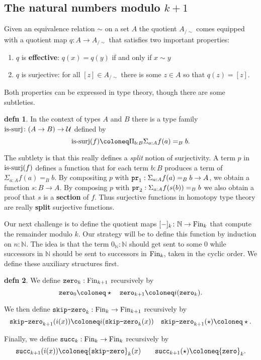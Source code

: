 \documentclass{amsart}
\theoremstyle{theorem}
\theoremstyle{definition}
\newtheorem*{defn}{defn}
\theoremstyle{remark}
\newcommand{\0}{\mathbbe{0}}
\newcommand{\1}{\mathbbe{1}}
\newcommand{\2}{\mathbbe{2}}
\newcommand{\3}{\mathbbe{3}}
\newcommand{\4}{\mathbbe{4}}
\newcommand{\term}[1]{{\textup{\texttt{#1}}}}
\newcommand{\type}[1]{{\textup{#1}}}
\newcommand{\bN}{{\mathbb{N}}}
\newcommand{\pr}{\term{pr}}
\newcommand{\UU}{{\mathcal{U}}}
\begin{document}
\subsection*{The natural numbers modulo $k+1$}

Given an equivalence relation $\sim$ on a set $A$ the quotient $A_{/\sim}$ comes equipped with a quotient map $q \colon A \to A_{/\sim}$ that satisfies two important properties:
\begin{enumerate}
\item $q$ is \textbf{effective}: $q(x) = q(y)$ if and only if $x \sim y$
\item $q$ is surjective: for all $[z] \in A_{/\sim}$ there is some $z \in A$ so that $q(z) = [z]$.
\end{enumerate}

Both properties can be expressed in type theory, though there are some subtleties.

\begin{defn} In the context of types $A$ and $B$ there is a type family $\type{is-surj} \colon (A \to B) \to \UU$ defined by
\[ \type{is-surj}(f) \coloneq \Pi_{b : B} \Sigma_{a : A} f(a) =_B b.\]
\end{defn}

The subtlety is that this really defines a \emph{split} notion of surjectivity. A term $p$ in $\type{is-surj}(f)$ defines a function that for each term $b : B$ produces a term of $\Sigma_{a : A} f(a) =_B b$. By compositing $p$ with $\pr_1 : \Sigma_{a : A} f(a) =_B b \to A$, we obtain a function $s \colon B \to A$. By composing $p$ with $\pr_2 : \Sigma_{a : A} f(s(b)) =_B b$ we also obtain a proof that $s$ is a \textbf{section} of $f$. Thus surjective functions in homotopy type theory are really \textbf{split} surjective functions.

Our next challenge is to define the quotient maps $[-]_{k} \colon \bN \to \type{Fin}_{k}$ that compute the remainder modulo $k$. Our strategy will be to define this function by induction on $n : \bN$. The idea is that the term $0_\bN : \bN$ should get sent to some $0$ while successors in $\bN$ should be sent to successors in $\type{Fin}_k$, taken in the cyclic order. We define these auxiliary structures first.

\begin{defn} We define $\term{zero}_k : \type{Fin}_{k+1}$ recursively by
\[ \term{zero}_0 \coloneq \star \quad \term{zero}_{k+1} \coloneq i(\term{zero}_k).\]

We then define $\term{skip-zero}_k : \type{Fin}_k \to \type{Fin}_{k+1}$ recursively by
\[ \term{skip-zero}_{k+1}(i(x)) \coloneq i(\term{skip-zero}_k(x)) \quad \term{skip-zero}_{k+1}(\star) \coloneq \star.\]

Finally, we define $\term{succ}_k : \type{Fin}_k \to \type{Fin}_k$ recursively by
\[ \term{succ}_{k+1}(i(x)) \coloneq \term{skip-zero}_k(x) \qquad \term{succ}_{k+1}(\star) \coloneq \term{zero}_k.\]
\end{defn}
\end{document}
